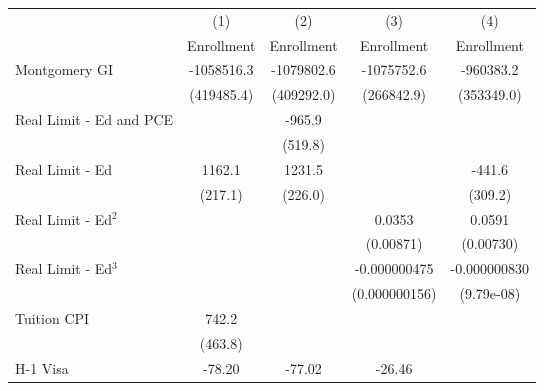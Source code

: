 
\begin{tabular}{l*{4}{c}}
    \toprule
                             &\multicolumn{1}{c}{(1)}&\multicolumn{1}{c}{(2)}&\multicolumn{1}{c}{(3)}&\multicolumn{1}{c}{(4)}\\
                             &\multicolumn{1}{c}{Enrollment}&\multicolumn{1}{c}{Enrollment}&\multicolumn{1}{c}{Enrollment}&\multicolumn{1}{c}{Enrollment}\\
    \midrule
    Montgomery GI            &  -1058516.3\sym{*}  &  -1079802.6\sym{*}  &  -1075752.6\sym{***}&   -960383.2\sym{*}  \\
                             &  (419485.4)         &  (409292.0)         &  (266842.9)         &  (353349.0)         \\
    \addlinespace
    Real Limit - Ed and PCE  &                     &      -965.9         &                     &                     \\
                             &                     &     (519.8)         &                     &                     \\
    \addlinespace
    Real Limit - Ed          &      1162.1\sym{***}&      1231.5\sym{***}&                     &      -441.6         \\
                             &     (217.1)         &     (226.0)         &                     &     (309.2)         \\
    \addlinespace
    Real Limit - Ed$^2$        &                     &                     &      0.0353\sym{***}&      0.0591\sym{***}\\
                             &                     &                     &   (0.00871)         &   (0.00730)         \\
    \addlinespace
    Real Limit - Ed$^3$        &                     &                     &-0.000000475\sym{**} &-0.000000830\sym{***}\\
                             &                     &                     &(0.000000156)         &  (9.79e-08)         \\
    \addlinespace
    Tuition CPI              &       742.2         &                     &                     &                     \\
                             &     (463.8)         &                     &                     &                     \\
    \addlinespace
    H-1 Visa                 &      -78.20\sym{**} &      -77.02\sym{**} &      -26.46         &                     \\

\end{tabular}
